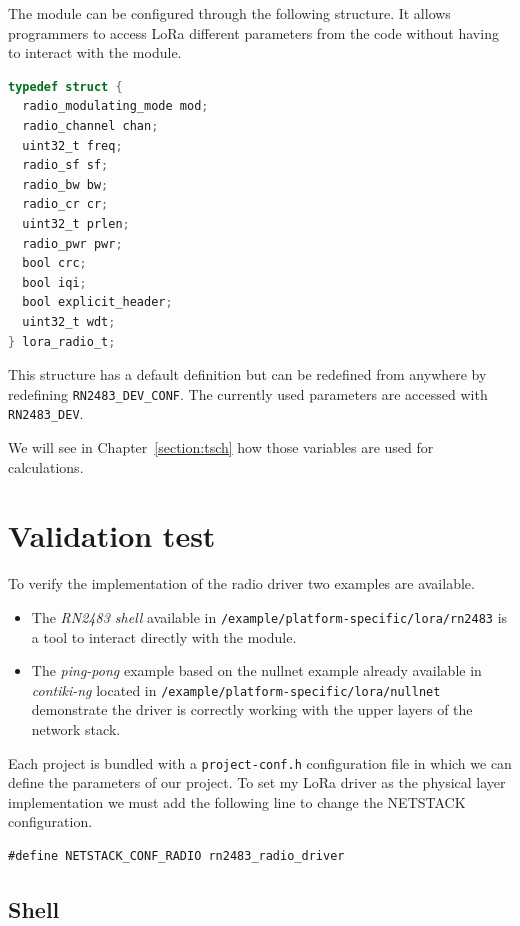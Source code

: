 The module can be configured through the following structure.
It allows programmers to access LoRa different parameters from the code without
having to interact with the module.

\begin{lstlisting}[language=C]
typedef struct {
  radio_modulating_mode mod;
  radio_channel chan;
  uint32_t freq;
  radio_sf sf;
  radio_bw bw;
  radio_cr cr;
  uint32_t prlen;
  radio_pwr pwr;
  bool crc;
  bool iqi;
  bool explicit_header;
  uint32_t wdt;
} lora_radio_t;
\end{lstlisting}

This structure has a default definition but can be redefined from anywhere 
by redefining \lstinline{RN2483_DEV_CONF}.
The currently used parameters are accessed with \lstinline{RN2483_DEV}.

We will see in Chapter~\ref{section:tsch} how those variables are used for
calculations.

\section{Validation test}

To verify the implementation of the radio driver two examples are available.

\begin{itemize}
  \item The \emph{RN2483 shell} available in
    \lstinline{/example/platform-specific/lora/rn2483} is a tool to interact
    directly with the module.
  \item The \emph{ping-pong} example based on the nullnet example already
    available in \emph{contiki-ng} located in 
    \lstinline{/example/platform-specific/lora/nullnet} demonstrate the driver
    is correctly working with the upper layers of the network stack.
\end{itemize}

Each project is bundled with a \lstinline{project-conf.h}
configuration file in which we can define the parameters of our project. 
To set my LoRa driver as the physical layer implementation we must add the
following line to change the NETSTACK configuration.

\begin{lstlisting}
#define NETSTACK_CONF_RADIO rn2483_radio_driver
\end{lstlisting}

\subsection{Shell}

